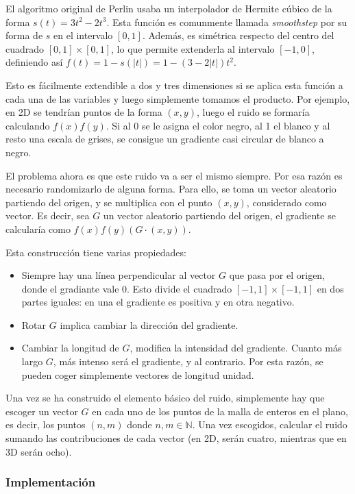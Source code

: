 \documentclass[12pt]{article}
\newcommand{\inputtikz}[1]{%
  \tikzsetnextfilename{#1}%
}
\theoremstyle{definition}
\theoremstyle{remark}
\begin{document}
El algoritmo original de Perlin usaba un interpolador de Hermite cúbico de la forma $s(t)=3t^2-2t^3$. Esta función es comunmente llamada \textit{smoothstep} por su forma de $s$ en el intervalo $[0,1]$. Además, es simétrica respecto del centro del cuadrado $[0,1]\times[0,1]$, lo que permite extenderla al intervalo $[-1,0]$, definiendo así $f(t)=1-s(|t|)=1-(3-2|t|)t^2$.

\inputtikz{hermite}

Esto es fácilmente extendible a dos y tres dimensiones si se aplica esta función a cada una de las variables y luego simplemente tomamos el producto. Por ejemplo, en 2D se tendrían puntos de la forma $(x,y)$, luego el ruido se formaría calculando $f(x)f(y)$. Si al 0 se le asigna el color negro, al 1 el blanco y al resto una escala de grises, se consigue un gradiente casi circular de blanco a negro.

\inputtikz{noise}

El problema ahora es que este ruido va a ser el mismo siempre. Por esa razón es necesario randomizarlo de alguna forma. Para ello, se toma un vector aleatorio partiendo del origen, y se multiplica con el punto $(x,y)$, considerado como vector. Es decir, sea $G$ un vector aleatorio partiendo del origen, el gradiente se calcularía como $f(x)f(y)(G\cdot(x,y))$.

Esta construcción tiene varias propiedades:
\begin{itemize}
\item Siempre hay una línea perpendicular al vector $G$ que pasa por el origen, donde el gradiante vale 0. Esto divide el cuadrado $[-1,1]\times[-1,1]$ en dos partes iguales: en una el gradiente es positiva y en otra negativo.
\item Rotar $G$ implica cambiar la dirección del gradiente.
\item Cambiar la longitud de $G$, modifica la intensidad del gradiente. Cuanto más largo $G$, más intenso será el gradiente, y al contrario. Por esta razón, se pueden coger simplemente vectores de longitud unidad.
\end{itemize}

Una vez se ha construido el elemento básico del ruido, simplemente hay que escoger un vector $G$ en cada uno de los puntos de la malla de enteros en el plano, es decir, los puntos $(n,m)$ donde $n,m\in\mathbb{N}$. Una vez escogidos, calcular el ruido sumando las contribuciones de cada vector (en 2D, serán cuatro, mientras que en 3D serán ocho).

\subsubsection{Implementación}
\end{document}
